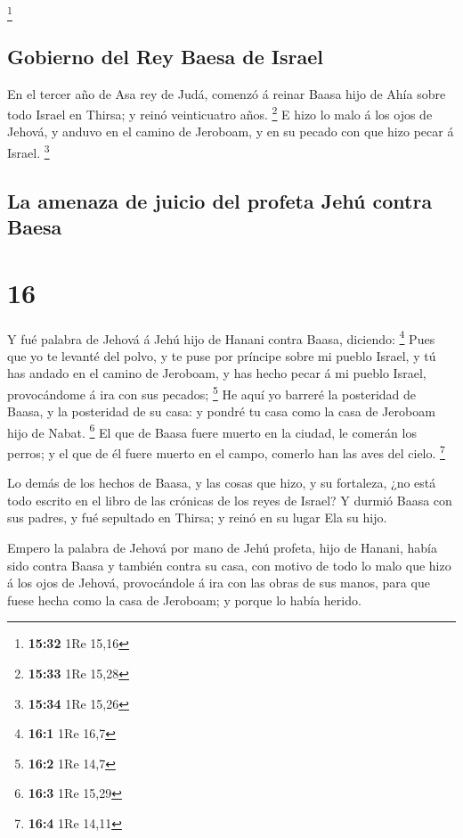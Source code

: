\footnote{\textbf{15:32} 1Re 15,16}

\hypertarget{gobierno-del-rey-baesa-de-israel}{%
\subsection{Gobierno del Rey Baesa de
Israel}\label{gobierno-del-rey-baesa-de-israel}}

 En el tercer año de Asa rey de Judá, comenzó á reinar
Baasa hijo de Ahía sobre todo Israel en Thirsa; y reinó veinticuatro
años. \footnote{\textbf{15:33} 1Re 15,28}  E hizo lo malo á
los ojos de Jehová, y anduvo en el camino de Jeroboam, y en su pecado
con que hizo pecar á Israel. \footnote{\textbf{15:34} 1Re 15,26}

\hypertarget{la-amenaza-de-juicio-del-profeta-jehuxfa-contra-baesa}{%
\subsection{La amenaza de juicio del profeta Jehú contra
Baesa}\label{la-amenaza-de-juicio-del-profeta-jehuxfa-contra-baesa}}

\hypertarget{section-15}{%
\section{16}\label{section-15}}

 Y fué palabra de Jehová á Jehú hijo de Hanani contra Baasa,
diciendo: \footnote{\textbf{16:1} 1Re 16,7}  Pues que yo te
levanté del polvo, y te puse por príncipe sobre mi pueblo Israel, y tú
has andado en el camino de Jeroboam, y has hecho pecar á mi pueblo
Israel, provocándome á ira con sus pecados; \footnote{\textbf{16:2} 1Re
  14,7}  He aquí yo barreré la posteridad de Baasa, y la
posteridad de su casa: y pondré tu casa como la casa de Jeroboam hijo de
Nabat. \footnote{\textbf{16:3} 1Re 15,29}  El que de Baasa
fuere muerto en la ciudad, le comerán los perros; y el que de él fuere
muerto en el campo, comerlo han las aves del cielo. \footnote{\textbf{16:4}
  1Re 14,11}

 Lo demás de los hechos de Baasa, y las cosas que hizo, y su
fortaleza, ¿no está todo escrito en el libro de las crónicas de los
reyes de Israel?  Y durmió Baasa con sus padres, y fué
sepultado en Thirsa; y reinó en su lugar Ela su hijo.

 Empero la palabra de Jehová por mano de Jehú profeta, hijo
de Hanani, había sido contra Baasa y también contra su casa, con motivo
de todo lo malo que hizo á los ojos de Jehová, provocándole á ira con
las obras de sus manos, para que fuese hecha como la casa de Jeroboam; y
porque lo había herido.

